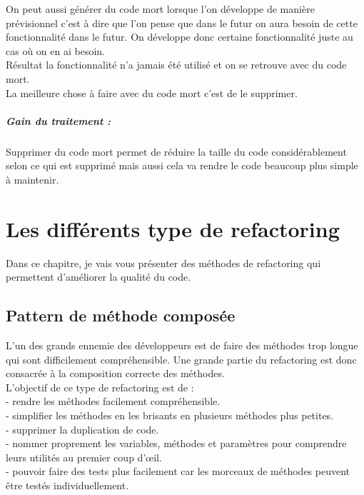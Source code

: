 \documentclass[a4paper,twoside,12pt,openright]{report}
\begin{document}
On peut aussi générer du code mort lorsque l'on développe de manière prévisionnel c'est à dire que l'on pense que dans le futur on aura besoin de cette fonctionnalité dans le futur.
On développe donc certaine fonctionnalité juste au cas où on en ai besoin.\\
Résultat la fonctionnalité n'a jamais été utilisé et on se retrouve avec du code mort.\\

La meilleure chose à faire avec du code mort c'est de le supprimer.\\

\paragraph{Gain du traitement :}
Supprimer du code mort permet de réduire la taille du code considérablement selon ce qui est supprimé mais aussi cela va rendre le code beaucoup plus simple à maintenir.\\




\chapter{Les différents type de refactoring}
Dans ce chapitre, je vais vous présenter des méthodes de refactoring qui permettent d'améliorer la qualité du code.\\

\section{Pattern de méthode composée}
L'un des grands ennemie des développeurs est de faire des méthodes trop longue qui sont difficilement compréhensible.
Une grande partie du refactoring est donc consacrée à la composition correcte des méthodes.\cite{ref5}\\

L'objectif de ce type de refactoring est de :\\
- rendre les méthodes facilement compréhensible.\\
- simplifier les méthodes en les brisants en plusieurs méthodes plus petites.\\
- supprimer la duplication de code.\\
- nommer proprement les variables, méthodes et paramètres pour comprendre leurs utilités au premier coup d'œil.\\
- pouvoir faire des tests plus facilement car les morceaux de méthodes peuvent être testés individuellement.\cite{ref6}
\end{document}
